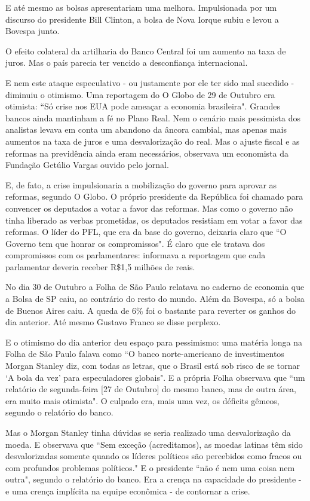 \documentclass{article}
\begin{document}
E até mesmo as bolsas apresentariam uma melhora. Impulsionada por um discurso do presidente Bill Clinton, a bolsa de Nova Iorque subiu e levou a Bovespa junto.  

O efeito colateral da artilharia do Banco Central foi um aumento na taxa de juros. Mas o país parecia ter vencido a desconfiança internacional. 

E nem este ataque especulativo - ou justamente por ele ter sido mal sucedido - diminuiu o otimismo. Uma reportagem do O Globo de 29 de Outubro era otimista: ``Só crise nos EUA pode ameaçar a economia brasileira". Grandes bancos ainda mantinham a fé no Plano Real. Nem o cenário mais pessimista dos analistas levava em conta um abandono da âncora cambial, mas apenas mais aumentos na taxa de juros e uma desvalorização do real. Mas o ajuste fiscal e as reformas na previdência ainda eram necessários, observava um economista da Fundação Getúlio Vargas ouvido pelo jornal.

E, de fato, a crise impulsionaria a mobilização do governo para aprovar as reformas, segundo O Globo. O próprio presidente da República foi chamado para convencer os deputados a votar a favor das reformas. Mas como o governo não tinha liberado as verbas prometidas, os deputados resistiam em votar a favor das reformas. O líder do PFL, que era da base do governo, deixaria claro que  ``O Governo tem que honrar os compromissos". É claro que ele tratava dos compromissos com os parlamentares: informava a reportagem que cada parlamentar deveria receber R\$1,5 milhões de reais.  %

No dia 30 de Outubro a Folha de São Paulo relatava no caderno de economia que a Bolsa de SP caiu, ao contrário do resto do mundo. Além da Bovespa, só a bolsa de Buenos Aires caiu. A queda de 6\% foi o bastante para reverter os ganhos do dia anterior. Até mesmo Gustavo Franco se disse perplexo.

E o otimismo do dia anterior deu espaço para pessimismo: uma matéria longa na Folha de São Paulo falava como ``O banco norte-americano de investimentos Morgan Stanley diz, com todas as letras, que o Brasil está sob risco de se tornar `A bola da vez' para especuladores globais". E a própria Folha observava que ``um relatório de segunda-feira [27 de Outubro] do mesmo banco, mas de outra área, era muito mais otimista". O culpado era, mais uma vez, os déficits gêmeos, segundo o relatório do banco.

Mas o Morgan Stanley tinha dúvidas se seria realizado uma desvalorização da moeda. E observava que ``Sem exceção (acreditamos), as moedas latinas têm sido desvalorizadas somente quando os líderes políticos são percebidos como fracos ou com profundos problemas políticos." E o presidente ``não é nem uma coisa nem outra", segundo o relatório do banco. Era a crença na capacidade do presidente - e uma crença implícita na equipe econômica - de contornar a crise. 
\end{document}
